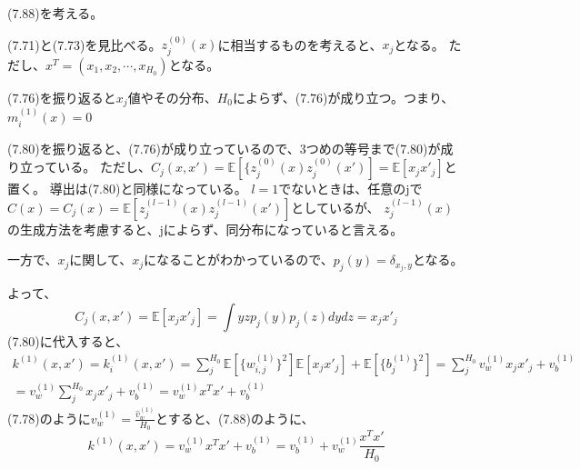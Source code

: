 \documentclass{jsarticle}
\begin{document}
(7.88)を考える。

(7.71)と(7.73)を見比べる。$z_j^{(0)}(x)$に相当するものを考えると、$x_j$となる。
ただし、$x^T = (x_1, x_2, \cdots, x_{H_0})$となる。

(7.76)を振り返ると$x_j$値やその分布、$H_0$によらず、(7.76)が成り立つ。つまり、$m_i^{(1)}(x) = 0$

(7.80)を振り返ると、(7.76)が成り立っているので、3つめの等号まで(7.80)が成り立っている。
ただし、$C_j(x, x') = \mathbb{E}[\{ z_j^{(0)}(x) z_j^{(0)}(x')] = \mathbb{E}[ x_j x'_j ]$と置く。
導出は(7.80)と同様になっている。
$l = 1$でないときは、任意のjで$C(x) = C_j(x) = \mathbb{E}[ z_j^{(l -1)}(x) z_j^{(l -1)}(x')]$としているが、
$z_j^{(l-1)}(x)$の生成方法を考慮すると、jによらず、同分布になっていると言える。

一方で、$x_j$に関して、$x_j$になることがわかっているので、$p_j(y) = \delta_{x_j, y}$となる。

よって、
\begin{equation}
C_j(x, x') = \mathbb{E}[ x_j x'_j] = \int yz p_j(y)p_j(z) dydz = x_j x'_j
\end{equation}
(7.80)に代入すると、
\begin{equation}
\begin{split}
k^{(1)}(x, x') = k_i^{(1)}(x, x') = \sum_j^{H_0} \mathbb{E}[\{ w_{i, j}^{(1)}\}^2]\mathbb{E}[x_j x'_j] + \mathbb{E}[\{ b_j^{(1)}\}^2]
= \sum_j^{H_0} v_w^{(1)} x_j x'_j + v_b^{(1)}\\
= v_w^{(1)} \sum_j^{H_0} x_j x'_j + v_b^{(1)}
= v_w^{(1)} x^T x' + v_b^{(1)}
\end{split}
\end{equation}
(7.78)のように$v_w^{(1)} = \frac{\hat{v}_w^{(1)}}{H_0}$とすると、(7.88)のように、
\begin{equation}
k^{(1)}(x, x') = v_w^{(1)} x^T x' + v_b^{(1)}
= v_b^{(1)} + v_w^{(1)} \frac{x^T x'}{H_0}
\end{equation}
\end{document}
